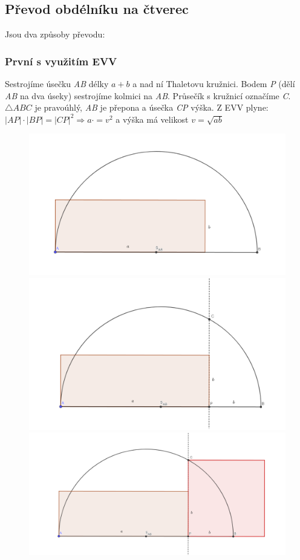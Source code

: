 \documentclass[12pt, a4paper]{article}
\newcommand{\imply}{\Rightarrow}
\begin{document}
\pagebreak

\subsection*{Převod obdélníku na čtverec}
Jsou dva způsoby převodu:\\
\subsubsection*{První s využitím EVV}
Sestrojíme úsečku \textit{AB} délky $a+b$ a nad ní Thaletovu kružnici. Bodem \textit{P} (dělí \textit{AB} na dva úseky) sestrojíme kolmici na \textit{AB}. Průsečík s kružnicí označíme 
\textit{C}. $\triangle ABC$ je pravoúhlý, \textit{AB} je přepona a úsečka \textit{CP} výška. Z EVV plyne: $|AP|\cdot |BP|=|CP|^2 \imply a \cdot = v^2$ a výška má velikost $v=\sqrt{ab}$
\begin{figure}[H]
\centering
\includegraphics[scale=0.3]{ponc1}
\includegraphics[scale=0.3]{ponc2}
\includegraphics[scale=0.3]{ponc3}
\end{figure} 
\end{document}
